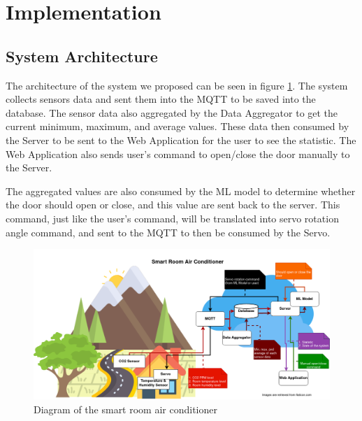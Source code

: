 \section{Implementation}

\subsection{System Architecture}
The architecture of the system we proposed can be seen in
figure \ref{iot-diagram}.
The system collects sensors data and sent them into the MQTT
to be saved into the database. The sensor data also aggregated
by the Data Aggregator to get the current minimum, maximum,
and average values. These data then consumed by the Server to
be sent to the Web Application for the user to see the
statistic. The Web Application also sends user's command to
open/close the door manually to the Server.

The aggregated values are also consumed by the ML model to
determine whether the door should open or close, and this
value are sent back to the server. This command, just like
the user's command, will be translated into servo rotation
angle command, and sent to the MQTT to then be consumed by
the Servo.

\begin{figure}
      \centering
      \includegraphics[scale=0.4]{resources/iot-diagram.png}
      \caption{Diagram of the smart room air conditioner}
      \label{iot-diagram}
\end{figure}

